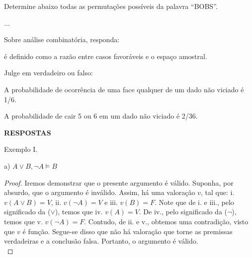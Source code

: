 \documentclass[12pt]{exam} %
\begin{document}
\begin{questions}
\question Determine abaixo todas as permutações possíveis da palavra \enquote{BOBS}.

\begin{solutionorbox}[1.5cm]
    ...
\end{solutionorbox}


\question Sobre análise combinatória, responda:

\question \fillin[Probabilidade] é definido como a razão entre casos favoráveis e o espaço amostral. 

\newcommand{\tf}[1][{}]{
    \fillin[#1][0.25in]
}
\question Julge em verdadeiro ou falso:
    \begin{parts}
        \item \tf[T] A probabilidade de ocorrência de uma face qualquer de um dado não viciado é 1/6.
        \item \tf[F] A probabilidade de cair 5 ou 6 em um dado não viciado é 2/36.
    \end{parts}



\end{questions}

\vspace{1cm}
\noindent \textbf{RESPOSTAS}

Exemplo I.

\bigskip

a) $A \lor B, \neg A \vDash B$

\begin{proof}
Iremos demonstrar que o presente argumento é válido. Suponha, por absurdo, que o argumento é inválido. Assim, há uma valoração $v$, tal que:
i. $v(A\lor B)=V$, 
ii. $v(\neg A)=V$ e 
iii. $v(B)=F$. Note que de i. e iii., pelo significado da ($\lor$), temos que iv. $v(A)=V$. De iv., pelo significado da ($\neg$), temos que v. $v(\neg A)=F$. Contudo, de ii. e v., obtemos uma contradição, visto que $v$ é função. Segue-se disso que não há valoração que torne as premissas verdadeiras e a conclusão falsa. Portanto, o argumento é válido.\\
\end{proof}
\end{document}
